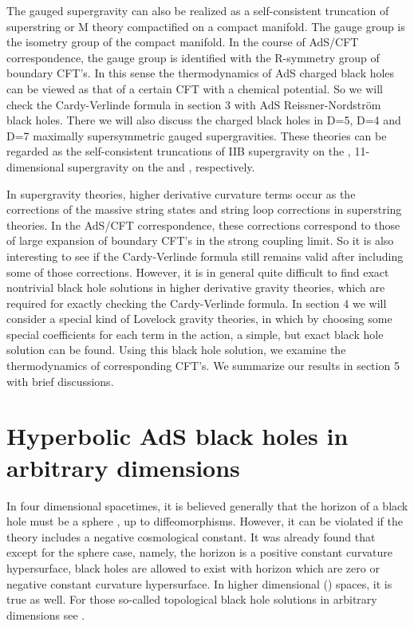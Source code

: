 \documentclass[a4paper,12pt]{article}
\providecommand{\sect}[1]{\setcounter{equation}{0}\section{#1}}
\begin{document}
The gauged supergravity
can also be  realized as a self-consistent truncation of superstring or M
theory compactified on a compact manifold. The gauge group is the isometry
group of the compact manifold. In the course of AdS/CFT correspondence, the
gauge group is identified with the R-symmetry group of boundary CFT's. In this
sense the thermodynamics of AdS charged black holes can be viewed as that of
a certain CFT with a chemical potential. So we will check the Cardy-Verlinde 
formula in section 3 with AdS Reissner-Nordstr\"om black holes. There we will
also discuss the charged black holes in D=5, D=4 and D=7 maximally 
supersymmetric gauged supergravities. These theories can be regarded as the
self-consistent truncations of IIB supergravity on the \coordHE{}, 11-dimensional 
supergravity on the \coordHE{} and \coordHE{}, respectively. 


 In supergravity theories, higher derivative curvature terms occur as the
 corrections of the massive string states and string loop corrections in 
superstring theories. In the AdS/CFT correspondence, these corrections
 correspond to those of large \coordHE{} expansion of boundary CFT's in the strong 
coupling limit. So it is also interesting to see if the Cardy-Verlinde formula
 still remains valid after including some of those corrections. However, it
 is in general quite difficult to find exact nontrivial
black hole solutions in higher derivative gravity theories, which are required
for exactly checking the Cardy-Verlinde formula. In section 4 we will consider
a special kind of Lovelock gravity theories, in which by choosing some special 
coefficients for each term in the action,  a simple, but exact  black hole 
solution can be found. Using this 
black hole solution, we examine the thermodynamics of corresponding CFT's.
We summarize our results in section 5 with brief discussions.    

  



\sect{Hyperbolic AdS black holes in arbitrary dimensions }

In four dimensional spacetimes, it is believed generally that the horizon
of a black hole must be a sphere \coordHE{}, up to diffeomorphisms. However, it 
can be violated if the theory includes a negative cosmological constant. 
It was already found that except for the sphere case, namely, the horizon is 
a positive constant curvature hypersurface, black holes are allowed to exist 
with horizon which are zero or negative constant curvature hypersurface. In 
higher dimensional (\coordHE{}) spaces, it is true as well.  For those so-called
topological black hole solutions in arbitrary dimensions see \cite{Birm}.
\end{document}
